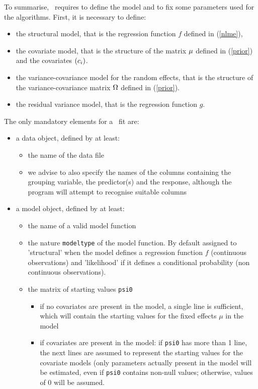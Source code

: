 To summarise, \saemix~requires to define the model and to fix some parameters used for the algorithms. First, it is necessary to define:
\begin{itemize}
\item the structural model, that is the regression function $f$ defined in (\ref{nlme}),
\item the covariate model, that is the structure of the matrix $\fixed_effect$ defined in (\ref{prior}) and the covariates $(c_i)$.
\item the variance-covariance model for the random effects, that is the structure of the variance-covariance matrix ${\Omega}$ defined in (\ref{prior}).
\item the residual variance model, that is the regression function $g$.
\end{itemize}
The only mandatory elements for a \saemix~fit are:
\begin{itemize}
\item a data object, defined by at least: 
   \begin{itemize}
   \item the name of the data file
   \item we advise to also specify the names of the columns containing the grouping variable, the predictor(s) and the response, although the program will attempt to recognise suitable columns
   \end{itemize}
\item a model object, defined by at least:
   \begin{itemize}
   \item the name of a valid model function
   \item the nature \texttt{modeltype} of the model function. By default assigned to 'structural' when the model defines a regression function $f$ (continuous observations) and 'likelihood' if it defines a conditional probability (non continuous observations).
   \item the matrix of starting values \texttt{psi0}
      \begin{itemize}
      \item if no covariates are present in the model, a single line is sufficient, which will contain the starting values for the fixed effects $\mu$ in the model
      \item if covariates are present in the model: if \texttt{psi0} has more than 1 line, the next lines are assumed to represent the starting values for the covariate models (only parameters actually present in the model will be estimated, even if \texttt{psi0} contains non-null values; otherwise, values of 0 will be assumed.
      \end{itemize}
   \end{itemize}
\end{itemize}

